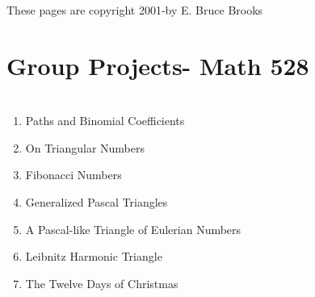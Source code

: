 \documentclass{article}
\begin{document}
These pages are copyright 2001-by E. Bruce Brooks

\section[Group Projects{}- Math 528]{Group Projects- Math 528}
\section{}
\begin{enumerate}
\item Paths and Binomial Coefficients
\item On Triangular Numbers
\item Fibonacci Numbers
\item Generalized Pascal Triangles
\item A Pascal-like Triangle of Eulerian Numbers
\item Leibnitz Harmonic Triangle
\item The Twelve Days of Christmas
\end{enumerate}
\end{document}
